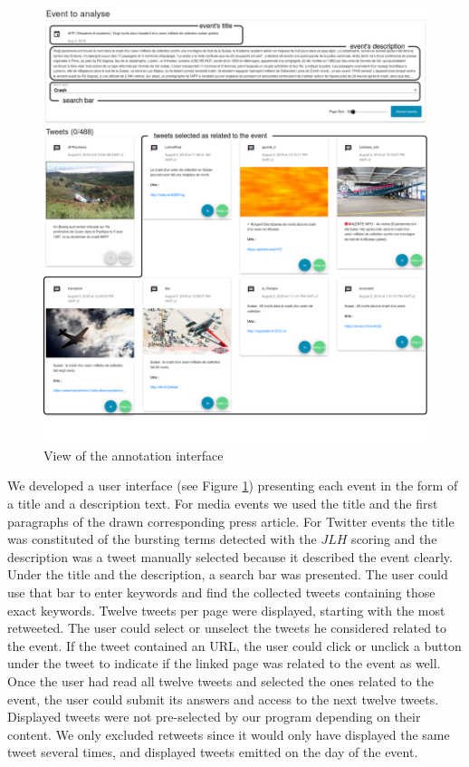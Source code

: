 \begin{figure}
\begin{center}
\includegraphics[width=1\textwidth]{figures/Crash_with_comments.png}
\end{center}

\caption{View of the annotation interface}
\label{Figure:Interface}
\end{figure}
We developed a user interface (see Figure \ref{Figure:Interface}) presenting each event in the form of a title and a description text. For media events we used the title and the first paragraphs of the drawn corresponding press article. For Twitter events the title was constituted of the bursting terms detected with the $JLH$ scoring and the description was a tweet manually selected because it described the event clearly. Under the title and the description, a search bar was presented. The user could use that bar to enter keywords and find the collected tweets containing those exact keywords. Twelve tweets per page were displayed, starting with the most retweeted. The user could select or unselect the tweets he considered related to the event. If the tweet contained an URL, the user could click or unclick a button under the tweet to indicate if the linked page was related to the event as well. Once the user had read all twelve tweets and selected the ones related to the event, the user could submit its answers and access to the next twelve tweets. Displayed tweets were not pre-selected by our program depending on their content. We only excluded retweets since it would only have displayed the same tweet several times, and displayed tweets emitted on the day of the event. 


